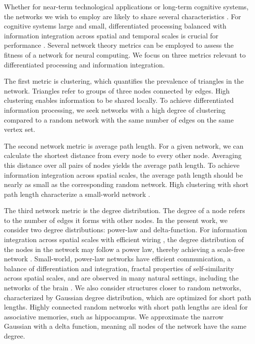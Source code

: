 \documentclass[twocolumn]{article}
\begin{document}
Whether for near-term technological applications or long-term cognitive systems, the networks we wish to employ are likely to share several characteristics \cite{busp2009}. For cognitive systems large and small, differentiated processing balanced with information integration across spatial and temporal scales is crucial for performance \cite{tosp2003,to2004,to2008,bu2006,sp2010,base2011,haah2017}. Several network theory metrics can be employed to assess the fitness of a network for neural computing. We focus on three metrics relevant to differentiated processing and information integration. 

The first metric is clustering, which quantifies the prevalence of triangles in the network. Triangles refer to groups of three nodes connected by edges. High clustering enables information to be shared locally. To achieve differentiated information processing, we seek networks with a high degree of clustering compared to a random network with the same number of edges on the same vertex set. 

The second network metric is average path length. For a given network, we can calculate the shortest distance from every node to every other node. Averaging this distance over all pairs of nodes yields the average path length. To achieve information integration across spatial scales, the average path length should be nearly as small as the corresponding random network. High clustering with short path length characterize a small-world network \cite{wast1998}. 

The third network metric is the degree distribution. The degree of a node refers to the number of edges it forms with other nodes. In the present work, we consider two degree distributions: power-law and delta-function. For information integration across spatial scales with efficient wiring \cite{busp2012}, the degree distribution of the nodes in the network may follow a power law, thereby achieving a scale-free network \cite{baal1999}. Small-world, power-law networks have efficient communication, a balance of differentiation and integration, fractal properties of self-similarity across spatial scales, and are observed in many natural settings, including the networks of the brain \cite{egch2005}. We also consider structures closer to random networks, characterized by Gaussian degree distribution, which are optimized for short path lengths. Highly connected random networks with short path lengths are ideal for associative memories, such as hippocampus. We approximate the narrow Gaussian with a delta function, meaning all nodes of the network have the same degree. 
\end{document}
